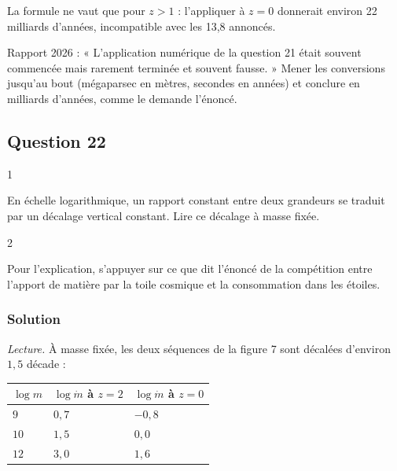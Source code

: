 \documentclass[11pt,a4paper]{article}
\newcommand{\equationajustee}[1]{%
  \sbox{\boiteequation}{$\displaystyle #1$}%
  \ifdim\wd\boiteequation>\linewidth
    \[\resizebox{\linewidth}{!}{\usebox{\boiteequation}}\]%
  \else
    \[#1\]%
  \fi}
\begin{document}
\equationajustee{\boxed{\Delta t\approx4\ \text{milliards d'\text{années}}}}

\begin{piege}

La formule ne vaut que pour \(z>1\) : l'appliquer à \(z=0\) donnerait environ 22 milliards d'années, incompatible avec les 13,8 annoncés.

\end{piege}

\begin{jury}

Rapport 2026 : « L'application numérique de la question 21 était souvent commencée mais rarement terminée et souvent fausse. » Mener les conversions jusqu'au bout (mégaparsec en mètres, secondes en années) et conclure en milliards d'années, comme le demande l'énoncé.

\end{jury}

\hypertarget{question-22}{%
\subsection{Question 22}\label{question-22}}

\begin{indication}{1}

En échelle logarithmique, un rapport constant entre deux grandeurs se traduit par un décalage vertical constant. Lire ce décalage à masse fixée.

\end{indication}

\begin{indication}{2}

Pour l'explication, s'appuyer sur ce que dit l'énoncé de la compétition entre l'apport de matière par la toile cosmique et la consommation dans les étoiles.

\end{indication}

\hypertarget{solution-21}{%
\subsubsection{Solution}\label{solution-21}}

\emph{Lecture.} À masse fixée, les deux séquences de la figure 7 sont décalées d'environ \(1{,}5\) décade :

\begin{longtable}[]{@{}lll@{}}
\toprule\noalign{}
\(\log m\) & \(\log\dot m\) à \(z=2\) & \(\log\dot m\) à \(z=0\) \\
\midrule\noalign{}
\endhead
\bottomrule\noalign{}
\endlastfoot
\(9\) & \(0{,}7\) & \(-0{,}8\) \\
\(10\) & \(1{,}5\) & \(0{,}0\) \\
\(12\) & \(3{,}0\) & \(1{,}6\) \\
\end{longtable}
\end{document}
